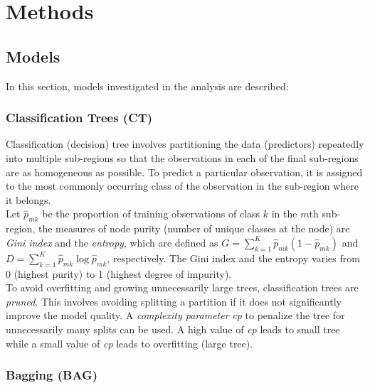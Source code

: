 \clearpage
\section{Methods}

\subsection{Models}
In this section, models investigated in the analysis are described:

\subsubsection{Classification Trees (CT)}

Classification (decision) tree involves partitioning the data (predictors) repeatedly into multiple sub-regions so that the observations in each of the final sub-regions are as homogeneous as possible. To predict a particular observation, it is assigned to the most commonly occurring class of the observation in the sub-region where it belongs. \\

\noindent Let $\hat{p}_{mk}$ be the proportion of training observations of class $k$ in the $m$th sub-region, the measures of node purity (number of unique classes at the node) are \textit{Gini index} and the \textit{entropy}, which are defined as $G = \sum_{k=1}^K\hat{p}_{mk}(1-\hat{p}_{mk})$ and $D = \sum_{k=1}^K\hat{p}_{mk}\log \hat{p}_{mk}$, respectively. The Gini index and the entropy varies from 0 (highest purity) to 1 (highest degree of impurity).\\ 

\noindent To avoid overfitting and growing unnecessarily large trees, classification trees are \textit{pruned}. This involves avoiding splitting a partition if it does not significantly improve the model quality. A \textit{complexity parameter} \textit{cp} to penalize the tree for  unnecessarily many splits can be used. A high value of \textit{cp} leads to small tree while a small value of \textit{cp} leads to overfitting (large tree). 

\subsubsection{Bagging (BAG)}

